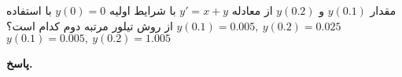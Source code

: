 مقدار
\(y(0.1)\)
و
\(y(0.2)\)
از معادله
\(y' = x + y\)
با شرایط اولیه
\(y(0) = 0\)
با استفاده از روش تیلور مرتبه دوم کدام است؟
          {\(y(0.1)=0.005,\  y(0.2)=0.025\)}{\(y(0.1)=0.005 ,\ y(0.2)=1.005\)}

\begin{answer}

	\textbf{پاسخ.}
	
\end{answer}
